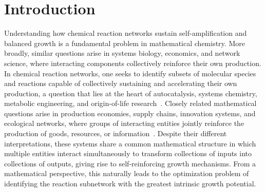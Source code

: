 \documentclass[a4paper,11pt,reqno]{amsart}
\begin{document}

\section{Introduction}\label{sec:intro}

Understanding how chemical reaction networks sustain self-amplification and balanced growth is a fundamental problem in mathematical chemistry. More broadly, similar questions arise in systems biology, economics, and network science, where interacting components collectively reinforce their own production. In chemical reaction networks, one seeks to identify subsets of molecular species and reactions capable of collectively sustaining and accelerating their own production, a question that lies at the heart of autocatalysis, systems chemistry, metabolic engineering, and origin-of-life research~\citep{kauffman1986,hordijk2004detecting,hordijk2018autocatalytic,feinberg2019foundations}. Closely related mathematical questions arise in production economies, supply chains, innovation systems, and ecological networks, where groups of interacting entities jointly reinforce the production of goods, resources, or information~\citep{neumann1945model,aghion2008economics,huang2014ecological,acemoglu2012network,acemoglu2017networks,baqaee2019granular,nagurney2013supply}. Despite their different interpretations, these systems share a common mathematical structure in which multiple entities interact simultaneously to transform collections of inputs into collections of outputs, giving rise to self-reinforcing growth mechanisms. From a mathematical perspective, this naturally leads to the optimization problem of identifying the reaction subnetwork with the greatest intrinsic growth potential.
\end{document}
